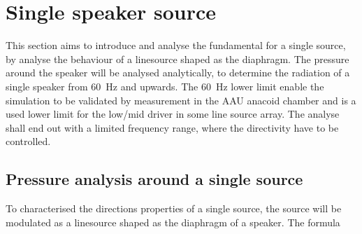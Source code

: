 \section{Single speaker source}
This section aims to introduce and analyse the fundamental for a single source, by analyse the behaviour of a linesource shaped as the diaphragm. The pressure around the speaker will be analysed analytically, to determine the radiation of a single speaker from \SI{60}{\hertz} and upwards. The \SI{60}{\hertz} lower limit enable the simulation to be validated by measurement in the AAU anacoid chamber and is a used lower limit for the low/mid driver in some line source array.  The analyse shall end out with a limited frequency range, where the directivity have to be controlled.

\subsection{Pressure analysis around a single source}
To characterised the directions properties of a single source, the source will be modulated as a linesource shaped as the diaphragm of a speaker. The formula 


